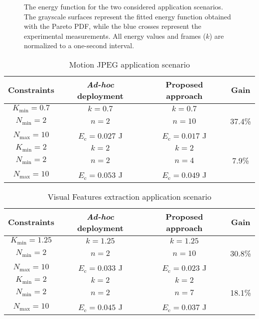 \documentclass[twocolumn,english]{IEEEtran}
\providecommand{\tabularnewline}{\\}
\theoremstyle{plain}
\theoremstyle{definition}
\begin{document}
\begin{figure*}[t]
\centering{}  \caption{The energy function for the two considered application scenarios.
The grayscale surfaces represent the fitted energy function obtained
with the Pareto PDF, while the blue crosses represent the experimental
measurements. All energy values and frames ($k$) are normalized to
a one-second interval.}
\end{figure*}


\begin{table}
\caption{Motion JPEG application scenario \label{tab:apps-jpeg}}
\begin{tabular}{|c||c|c|c|}
\hline 
Constraints & \emph{Ad-hoc} deployment  & Proposed approach  & Gain \tabularnewline
\hline 
\hline 
$K_{\text{min}}=0.7$ & $k=0.7$  & $k=0.7$  & \tabularnewline
$N_{\text{min}}=2$  & $n=2$  & $n=10$  & 37.4\% \tabularnewline
$N_{\text{max}}=10$  & $E_{\text{c}}=0.027$ J  & $E_{\text{c}}=0.017$ J  & \tabularnewline
\hline 
\hline 
$K_{\text{min}}=2$ & $k=2$  & $k=2$  & \tabularnewline
$N_{\text{min}}=2$  & $n=2$  & $n=4$  & 7.9\%\tabularnewline
$N_{\text{max}}=10$  & $E_{\text{c}}=0.053$ J  & $E_{\text{c}}=0.049$ J  & \tabularnewline
\hline 
\end{tabular}
\end{table}


\begin{table}
\caption{Visual Features extraction application scenario \label{tab:apps-vf}}
\begin{tabular}{|c||c|c|c|}
\hline 
Constraints & \emph{Ad-hoc} deployment  & Proposed approach  & Gain \tabularnewline
\hline 
\hline 
$K_{\text{min}}=1.25$ & $k=1.25$  & $k=1.25$  & \tabularnewline
$N_{\text{min}}=2$  & $n=2$  & $n=10$  & 30.8\% \tabularnewline
$N_{\text{max}}=10$  & $E_{\text{c}}=0.033$ J  & $E_{\text{c}}=0.023$ J  & \tabularnewline
\hline 
\hline 
$K_{\text{min}}=2$ & $k=2$  & $k=2$  & \tabularnewline
$N_{\text{min}}=2$  & $n=2$  & $n=7$  & 18.1\%\tabularnewline
$N_{\text{max}}=10$  & $E_{\text{c}}=0.045$ J  & $E_{\text{c}}=0.037$ J  & \tabularnewline
\hline 
\end{tabular}
\end{table}
\end{document}
